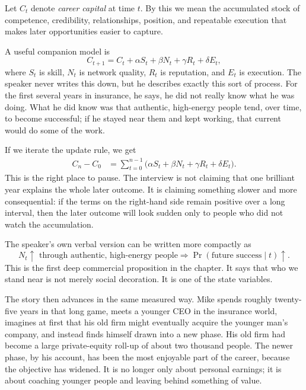 \begin{definition}
Let \(C_t\) denote \emph{career capital} at time \(t\). By this we mean the accumulated stock of competence, credibility, relationships, position, and repeatable execution that makes later opportunities easier to capture.
\end{definition}

A useful companion model is
\begin{equation}
C_{t+1}=C_t+\alpha S_t+\beta N_t+\gamma R_t+\delta E_t,
\end{equation}
where \(S_t\) is skill, \(N_t\) is network quality, \(R_t\) is reputation, and \(E_t\) is execution. The speaker never writes this down, but he describes exactly this sort of process. For the first several years in insurance, he says, he did not really know what he was doing. What he did know was that authentic, high-energy people tend, over time, to become successful; if he stayed near them and kept working, that current would do some of the work.

If we iterate the update rule, we get
\begin{align}
C_n-C_0
&=\sum_{t=0}^{n-1}\bigl(\alpha S_t+\beta N_t+\gamma R_t+\delta E_t\bigr).
\end{align}
This is the right place to pause. The interview is not claiming that one brilliant year explains the whole later outcome. It is claiming something slower and more consequential: if the terms on the right-hand side remain positive over a long interval, then the later outcome will look sudden only to people who did not watch the accumulation.

The speaker's own verbal version can be written more compactly as
\begin{equation}
N_t \uparrow \text{ through authentic, high-energy people}
\Longrightarrow
\Pr(\text{future success}\mid t)\uparrow.
\end{equation}
This is the first deep commercial proposition in the chapter. It says that who we stand near is not merely social decoration. It is one of the state variables.

The story then advances in the same measured way. Mike spends roughly twenty-five years in that long game, meets a younger CEO in the insurance world, imagines at first that his old firm might eventually acquire the younger man's company, and instead finds himself drawn into a new phase. His old firm had become a large private-equity roll-up of about two thousand people. The newer phase, by his account, has been the most enjoyable part of the career, because the objective has widened. It is no longer only about personal earnings; it is about coaching younger people and leaving behind something of value.

